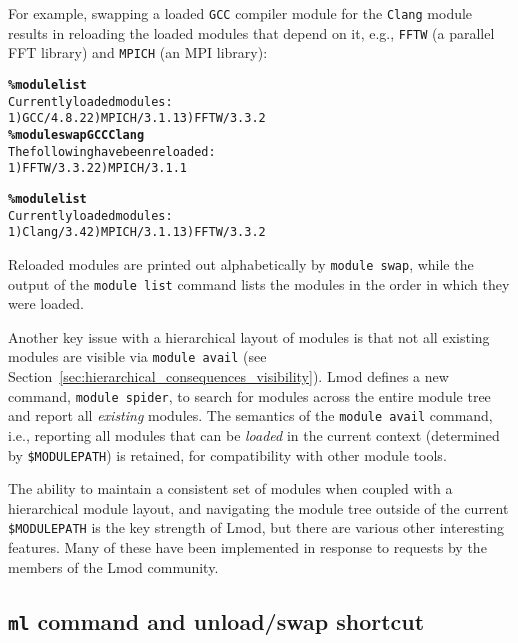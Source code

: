 For example, swapping a loaded \texttt{\small GCC} compiler module for the
\texttt{\small {Clang}} module results in reloading the loaded modules that
depend on it, e.g., \texttt{\small FFTW} (a parallel FFT library) and
\texttt{\small MPICH} (an MPI library):
{\small
  \begin{alltt}
    \textbf{\% module list}
    Currently loaded modules:
    1) GCC/4.8.2  2) MPICH/3.1.1  3) FFTW/3.3.2
    \textbf{\% module swap GCC Clang}
    The following have been reloaded:
    1) FFTW/3.3.2  2) MPICH/3.1.1
\end{alltt}}
{\small\begin{alltt}
    \textbf{\% module list}
    Currently loaded modules:
    1) Clang/3.4  2) MPICH/3.1.1  3) FFTW/3.3.2
\end{alltt}
}
\noindent
Reloaded modules are printed out
alphabetically by \texttt{\small module swap}, while the output of
the \texttt{\small module list} command lists the modules in the order in which
they were loaded.


Another key issue with a hierarchical layout of modules is that not all
existing modules are visible via \texttt{\small module avail} (see
Section~\ref{sec:hierarchical_consequences_visibility}). Lmod defines a
new command, \texttt{\small module spider}, to search for modules across the
entire module tree and report all \emph{existing} modules. The semantics of
the \texttt{\small module avail} command, i.e., reporting all modules that can
be \emph{loaded} in the current context (determined by
\texttt{\small \$MODULEPATH}) is retained, for compatibility with other module
tools.

The ability to maintain a consistent set of modules when coupled with a
hierarchical module layout, and navigating the module tree outside of the
current \texttt{\small \$MODULEPATH} is the key strength of Lmod, but there are
various other interesting features.  Many of these have been implemented in
response to requests by the members of the Lmod community.

\subsection{\texttt{\small ml} command and unload/swap shortcut}

